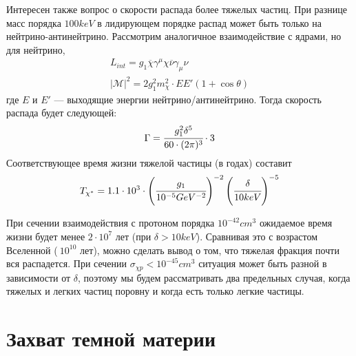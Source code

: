 Интересен также вопрос о скорости распада более тяжелых частиц. При разнице масс порядка $100 keV$ в лидирующем порядке распад может быть только на нейтрино-антинейтрино. Рассмотрим аналогичное взаимодействие с ядрами, но для нейтрино,
\begin{equation}
\begin{split}
	L_{int} = g_1\overline{\chi}\gamma^{\mu}\chi\overline{\nu}\gamma_{\mu}\nu\\
	|\mathcal{M}|^2= 2g_1^2m_{\chi}^2 \cdot EE'(1+\cos{\theta})
\end{split}
\end{equation}
где $E$ и $E'$ --- выходящие энергии нейтрино/антинейтрино. Тогда скорость распада будет следующей:
\begin{equation}
	\Gamma = \cfrac{g_1^2\delta^5}{60\cdot(2\pi)^3}\cdot 3
\end{equation}
Соответствующее время жизни тяжелой частицы (в годах) составит
\begin{equation}
	T_{\chi^*} = {1.1}\cdot 10^{3} \cdot \left(\cfrac{g_1}{10^{-5} GeV^{-2}}\right)^{-2} 
	\left(\cfrac{\delta}{10 keV}\right)^{-5}
\end{equation}

При сечении взаимодействия с протоном порядка $10^{-42} cm^3$ ожидаемое время жизни будет менее $2 \cdot 10^7$ лет (при $\delta > 10 keV$). Сравнивая это с возрастом Вселенной ($~10^10$ лет), можно сделать вывод о том, что тяжелая фракция почти вся распадется. При сечении $\sigma_{\chi p} < 10^{-45} cm^3$ ситуация может быть разной в зависимости от $\delta$, поэтому мы будем рассматривать два предельных случая, когда тяжелых и легких частиц поровну и когда есть только легкие частицы.


\section{Захват темной материи}

